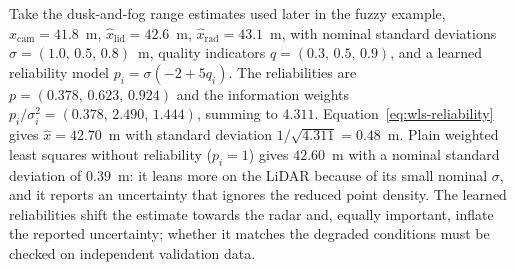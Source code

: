 \begin{example}
\label{ex:logistic-wls}
Take the dusk-and-fog range estimates used later in the fuzzy example, $\widehat{x}_{\mathrm{cam}}=41.8$~m, $\widehat{x}_{\mathrm{lid}}=42.6$~m, $\widehat{x}_{\mathrm{rad}}=43.1$~m, with nominal standard deviations $\sigma=(1.0,\,0.5,\,0.8)$~m, quality indicators $q=(0.3,\,0.5,\,0.9)$, and a learned reliability model $p_i=\sigma(-2+5q_i)$. The reliabilities are $p=(0.378,\,0.623,\,0.924)$ and the information weights $p_i/\sigma_i^{2}=(0.378,\,2.490,\,1.444)$, summing to $4.311$. Equation~\eqref{eq:wls-reliability} gives $\widehat{x}=42.70$~m with standard deviation $1/\sqrt{4.311}=0.48$~m. Plain weighted least squares without reliability ($p_i=1$) gives $42.60$~m with a nominal standard deviation of $0.39$~m: it leans more on the LiDAR because of its small nominal $\sigma$, and it reports an uncertainty that ignores the reduced point density. The learned reliabilities shift the estimate towards the radar and, equally important, inflate the reported uncertainty; whether it matches the degraded conditions must be checked on independent validation data.
\end{example}

